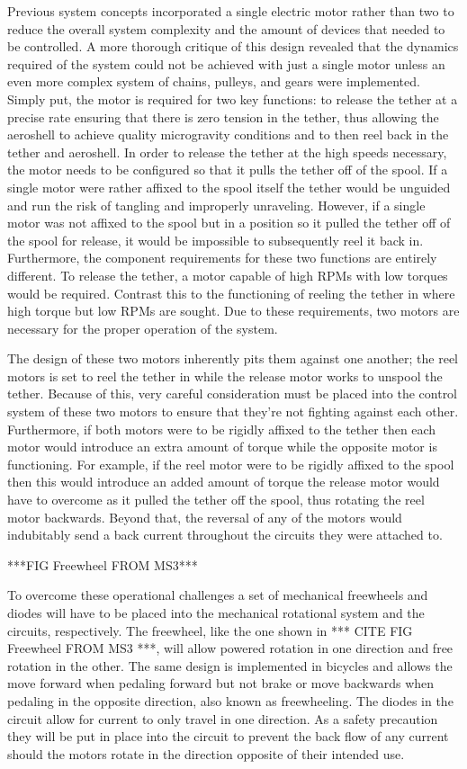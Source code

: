 \indent\indent Previous system concepts incorporated a single electric motor rather than two to reduce the overall system complexity and the amount of devices that needed to be controlled. A more thorough critique of this design revealed that the dynamics required of the system could not be achieved with just a single motor unless an even more complex system of chains, pulleys, and gears were implemented. Simply put, the motor is required for two key functions: to release the tether at a precise rate ensuring that there is zero tension in the tether, thus allowing the aeroshell to achieve quality microgravity conditions and to then reel back in the tether and aeroshell. In order to release the tether at the high speeds necessary, the motor needs to be configured so that it pulls the tether off of the spool. If a single motor were rather affixed to the spool itself the tether would be unguided and run the risk of tangling and improperly unraveling. However, if a single motor was not affixed to the spool but in a position so it pulled the tether off of the spool for release, it would be impossible to subsequently reel it back in. Furthermore, the component requirements for these two functions are entirely different. To release the tether, a motor capable of high RPMs with low torques would be required. Contrast this to the functioning of reeling the tether in where high torque but low RPMs are sought. Due to these requirements, two motors are necessary for the proper operation of the system. 

\indent\indent The design of these two motors inherently pits them against one another; the reel motors is set to reel the tether in while the release motor works to unspool the tether. Because of this, very careful consideration must be placed into the control system of these two motors to ensure that they're not fighting against each other. Furthermore, if both motors were to be rigidly affixed to the tether then each motor would introduce an extra amount of torque while the opposite motor is functioning. For example, if the reel motor were to be rigidly affixed to the spool then this would introduce an added amount of torque the release motor would have to overcome as it pulled the tether off the spool, thus rotating the reel motor backwards. Beyond that, the reversal of any of the motors would indubitably send a back current throughout the circuits they were attached to. 

***FIG Freewheel FROM MS3***

\indent\indent To overcome these operational challenges a set of mechanical freewheels and diodes will have to be placed into the mechanical rotational system and the circuits, respectively. The freewheel, like the one shown in *** CITE FIG Freewheel FROM MS3 ***, will allow powered rotation in one direction and free rotation in the other. The same design is implemented in bicycles and allows the move forward when pedaling forward but not brake or move backwards when pedaling in the opposite direction, also known as freewheeling. The diodes in the circuit allow for current to only travel in one direction. As a safety precaution they will be put in place into the circuit to prevent the back flow of any current should the motors rotate in the direction opposite of their intended use.

